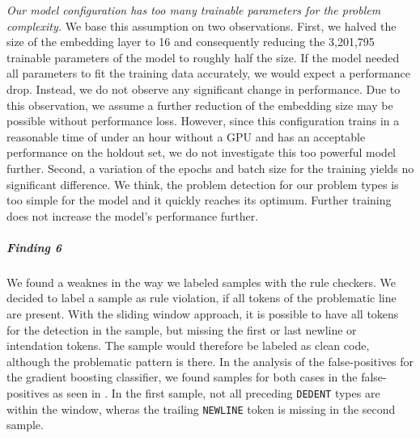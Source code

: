 \textit{Our model configuration has too many trainable parameters for the problem complexity.} We base this assumption on two observations. First, we halved the size of the embedding layer to 16 and consequently reducing the 3,201,795 trainable parameters of the model to roughly half the size. If the model needed all parameters to fit the training data accurately, we would expect a performance drop. Instead, we do not observe any significant change in performance. Due to this observation, we assume a further reduction of the embedding size may be possible without performance loss. However, since this configuration trains in a reasonable time of under an hour without a GPU and has an acceptable performance on the holdout set, we do not investigate this too powerful model further.
Second, a variation of the epochs and batch size for the training yields no significant difference. We think, the problem detection for our problem types is too simple for the model and it quickly reaches its optimum. Further training does not increase the model's performance further. 

\begin{center}
\end{center}

\subparagraph{Finding 6}
We found a weaknes in the way we labeled samples with the rule checkers. We decided to label a sample as rule violation, if all tokens of the problematic line are present. With the sliding window approach, it is possible to have all tokens for the detection in the sample, but missing the first or last newline or intendation tokens. The sample would therefore be labeled as clean code, although the problematic pattern is there. In the analysis of the false-positives for the gradient boosting classifier, we found samples for both cases in the false-positives as seen in . In the first sample, not all preceding \texttt{DEDENT} types are within the window, wheras the trailing \texttt{NEWLINE} token is missing in the second sample.

